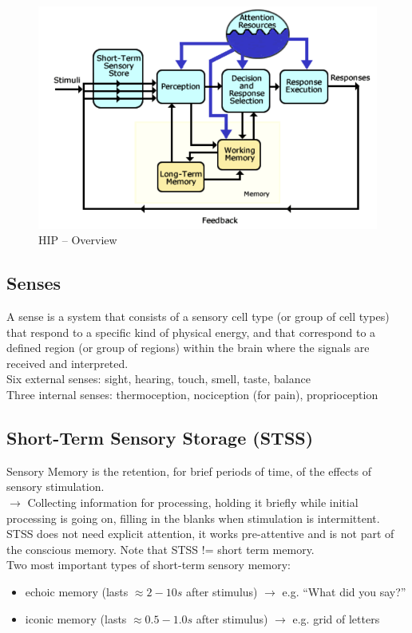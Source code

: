 \begin{figure}[h!]
	\centering
	\includegraphics[width=.5\textwidth]{img/ch03_hip_overview}
	\caption{HIP -- Overview}
	\label{hip}
\end{figure} 

\subsection{Senses}
A sense is a system that consists of a sensory cell type (or group of cell types) that respond to a specific kind of physical energy, and that correspond to a defined region (or group of regions) within the brain where the signals are received and interpreted.\\
Six external senses: sight, hearing, touch, smell, taste, balance\\
Three internal senses: thermoception, nociception (for pain), proprioception 

\subsection{Short-Term Sensory Storage (STSS)}
Sensory Memory is the retention, for brief periods of time, of the effects of sensory stimulation.\\
$\rightarrow$ Collecting information for processing, holding it briefly while initial processing is going on, filling in the blanks when stimulation is intermittent.\\
STSS does not need explicit attention, it works pre-attentive and is not part of the conscious memory. Note that STSS != short term memory.\\
Two most important types of short-term sensory memory:
\begin{itemize}
\item echoic memory (lasts $\approx 2-10s$ after stimulus) $\rightarrow$ e.g. ``What did you say?''
\item iconic memory (lasts $\approx 0.5-1.0s$ after stimulus) $\rightarrow$ e.g. grid of letters
\end{itemize}

